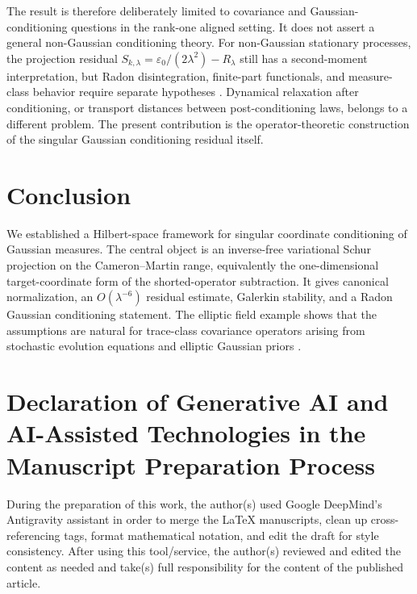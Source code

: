 \documentclass[11pt]{amsart}
\theoremstyle{plain}
\theoremstyle{definition}
\theoremstyle{remark}
\begin{document}
The result is therefore deliberately limited to covariance and Gaussian-conditioning questions in the rank-one aligned setting.  It does not assert a general non-Gaussian conditioning theory.  For non-Gaussian stationary processes, the projection residual $S_{k,\lambda}=\varepsilon_0/(2\lambda^2)-R_\lambda$ still has a second-moment interpretation, but Radon disintegration, finite-part functionals, and measure-class behavior require separate hypotheses \cite{bogachev2007measure,kallenberg2021foundations}.  Dynamical relaxation after conditioning, or transport distances between post-conditioning laws, belongs to a different problem.  The present contribution is the operator-theoretic construction of the singular Gaussian conditioning residual itself.

\section{Conclusion}
\label{sec:conclusion}

We established a Hilbert-space framework for singular coordinate conditioning of Gaussian measures. The central object is an inverse-free variational Schur projection on the Cameron--Martin range, equivalently the one-dimensional target-coordinate form of the shorted-operator subtraction. It gives canonical normalization, an $O(\lambda^{-6})$ residual estimate, Galerkin stability, and a Radon Gaussian conditioning statement. The elliptic field example shows that the assumptions are natural for trace-class covariance operators arising from stochastic evolution equations and elliptic Gaussian priors \cite{daprato2014stochastic,lord2014introduction,stuart2010inverse}.

\section*{Declaration of Generative AI and AI-Assisted Technologies in the Manuscript Preparation Process}

During the preparation of this work, the author(s) used Google DeepMind's Antigravity assistant in order to merge the LaTeX manuscripts, clean up cross-referencing tags, format mathematical notation, and edit the draft for style consistency. After using this tool/service, the author(s) reviewed and edited the content as needed and take(s) full responsibility for the content of the published article.




\appendix


\end{document}
